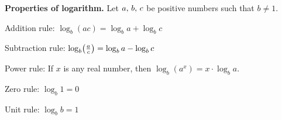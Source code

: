 \documentclass[a4paper,oneside,12pt]{article}
\begin{document}
\begin{theorem}
\label{thm:logarithm:properties}
\textbf{Properties of logarithm.}
Let ${a},\, {b},\, {c}$ be positive numbers such that $b \neq 1$.
\begin{packedenum}
\item\label{thm:logarithm:properties_addition}
  Addition rule:
  $\log_b (ac) = \log_b a + \log_b c$

\item\label{thm:logarithm:properties_subtraction}
  Subtraction rule:
  $\log_b \parenthesis*{\frac{a}{c}} = \log_b a - \log_b c$

\item\label{thm:logarithm:properties_multiplication}
  Power rule:
  If $x$ is any real number, then $\log_b (a^x) = x \cdot \log_b a$.

\item\label{thm:logarithm:properties_log_1}
  Zero rule: $\log_b 1 = 0$

\item\label{thm:logarithm:properties_log_b}
  Unit rule: $\log_b b = 1$
\end{packedenum}
\end{theorem}
\end{document}
